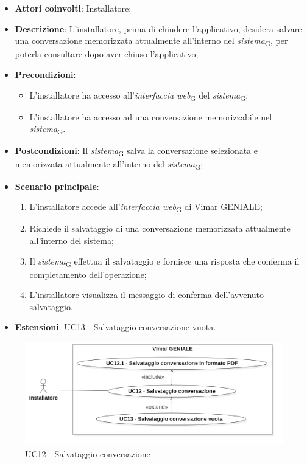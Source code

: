 \begin{itemize}
    \item \textbf{Attori coinvolti}: Installatore;
    \item \textbf{Descrizione}: L’installatore, prima di chiudere l’applicativo, desidera salvare una conversazione memorizzata attualmente all’interno del \textit{sistema}\textsubscript{G}, per poterla consultare dopo aver chiuso l'applicativo;
    \item \textbf{Precondizioni}: 
    \begin{itemize}
        \item L’installatore ha accesso all’\textit{interfaccia web}\textsubscript{G} del \textit{sistema}\textsubscript{G};
        \item L’installatore ha accesso ad una conversazione memorizzabile nel \textit{sistema}\textsubscript{G}.
    \end{itemize}
    \item \textbf{Postcondizioni}: Il \textit{sistema}\textsubscript{G} salva la conversazione selezionata e memorizzata attualmente all’interno del \textit{sistema}\textsubscript{G};
    \item \textbf{Scenario principale}:
    \begin{enumerate}
        \item L’installatore accede all’\textit{interfaccia web}\textsubscript{G} di Vimar GENIALE;
        \item Richiede il salvataggio di una conversazione memorizzata attualmente all'interno del sistema;
        \item Il \textit{sistema}\textsubscript{G} effettua il salvataggio e fornisce una risposta che conferma il completamento dell’operazione;
        \item L’installatore visualizza il messaggio di conferma dell’avvenuto salvataggio.
    \end{enumerate}
    \item \textbf{Estensioni}: UC13 - Salvataggio conversazione vuota.
\end{itemize}
\begin{figure}[H]
\centering
\includegraphics[width=1\textwidth]{contents/casi_duso/png/UC12.png}
\caption{UC12 - Salvataggio conversazione}
\end{figure}

